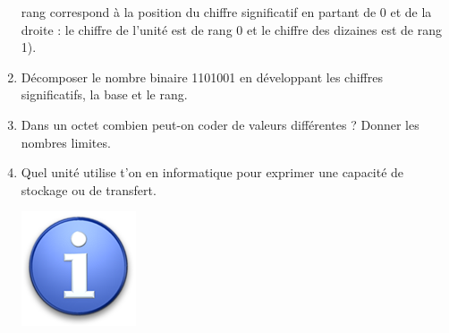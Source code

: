 \documentclass{article}
\begin{document}
\begin{enumerate}
		rang correspond à la position du chiffre significatif en partant de 0 et de la droite : le chiffre de l'unité
		est de rang 0 et le chiffre des dizaines est de rang 1).\\
\vspace{1em}
\begin{Form}
	\TextField[name=r6,width=\linewidth,height=2.5em,multiline=true]{}
\end{Form}
	\item Décomposer le nombre binaire 1101001 en développant les chiffres significatifs, la base et le rang.\\
\vspace{1em}
\begin{Form}
	\TextField[name=r7,width=\linewidth,height=2.5em,multiline=true]{}
\end{Form}
	\item Dans un octet combien peut-on coder de valeurs différentes ? Donner les nombres limites.\\
\vspace{1em}
\begin{Form}
	\TextField[name=r8,width=\linewidth,height=2.5em,multiline=true]{}
\end{Form}
	\item Quel unité utilise t'on en informatique pour exprimer une capacité de stockage ou de transfert.\\
\vspace{1em}
\begin{Form}
	\TextField[name=r9,width=\linewidth,height=2.5em,multiline=true]{}
\end{Form}
\begin{minipage}[b]{.08\linewidth}
	\includegraphics[width=\linewidth]{./figures/info.png}

\end{minipage}
\end{enumerate}
\end{document}
